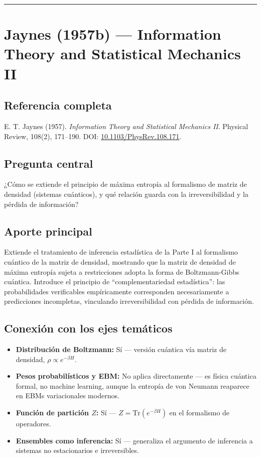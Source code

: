 \documentclass[12pt]{article}
\begin{document}
\bigskip
\hrule
\bigskip

\section{Jaynes (1957b) --- Information Theory and Statistical Mechanics II}

\subsection*{Referencia completa}
E. T. Jaynes (1957). \textit{Information Theory and Statistical Mechanics II}. Physical
Review, 108(2), 171--190. DOI: \href{https://doi.org/10.1103/PhysRev.108.171}{10.1103/PhysRev.108.171}.
\cite{jaynes1957b}

\subsection*{Pregunta central}
¿Cómo se extiende el principio de máxima entropía al formalismo de matriz de densidad
(sistemas cuánticos), y qué relación guarda con la irreversibilidad y la pérdida de
información?

\subsection*{Aporte principal}
Extiende el tratamiento de inferencia estadística de la Parte I al formalismo cuántico de la
matriz de densidad, mostrando que la matriz de densidad de máxima entropía sujeta a
restricciones adopta la forma de Boltzmann-Gibbs cuántica. Introduce el principio de
``complementariedad estadística'': las probabilidades verificables empíricamente corresponden
necesariamente a predicciones incompletas, vinculando irreversibilidad con pérdida de
información.

\subsection*{Conexión con los ejes temáticos}
\begin{itemize}
  \item \textbf{Distribución de Boltzmann:} Sí --- versión cuántica vía matriz de densidad, $\rho \propto e^{-\beta H}$.
  \item \textbf{Pesos probabilísticos y EBM:} No aplica directamente --- es física cuántica formal, no machine learning, aunque la entropía de von Neumann reaparece en EBMs variacionales modernos.
  \item \textbf{Función de partición $Z$:} Sí --- $Z = \mathrm{Tr}(e^{-\beta H})$ en el formalismo de operadores.
  \item \textbf{Ensembles como inferencia:} Sí --- generaliza el argumento de inferencia a sistemas no estacionarios e irreversibles.
\end{itemize}
\end{document}
